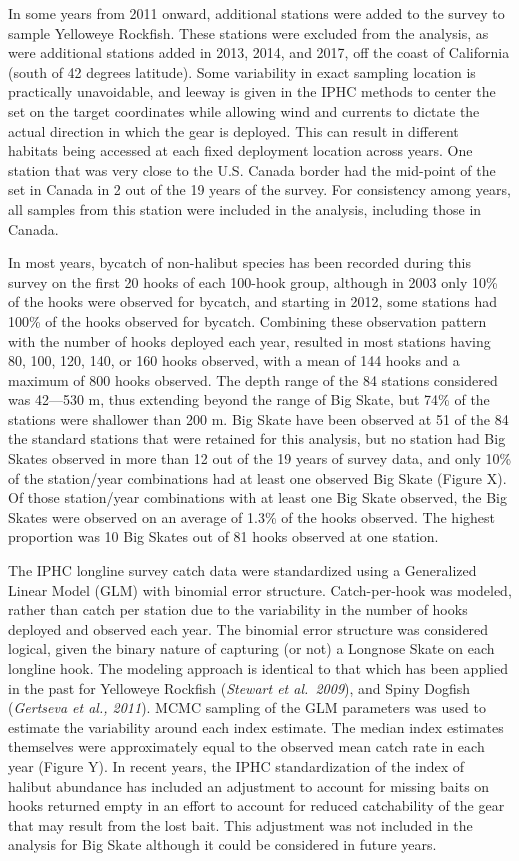 \documentclass[12pt,]{article}
\begin{document}
In some years from 2011 onward, additional stations were added to the
survey to sample Yelloweye Rockfish. These stations were excluded from
the analysis, as were additional stations added in 2013, 2014, and 2017,
off the coast of California (south of 42 degrees latitude). Some
variability in exact sampling location is practically unavoidable, and
leeway is given in the IPHC methods to center the set on the target
coordinates while allowing wind and currents to dictate the actual
direction in which the gear is deployed. This can result in different
habitats being accessed at each fixed deployment location across years.
One station that was very close to the U.S. Canada border had the
mid-point of the set in Canada in 2 out of the 19 years of the survey.
For consistency among years, all samples from this station were included
in the analysis, including those in Canada.

In most years, bycatch of non-halibut species has been recorded during
this survey on the first 20 hooks of each 100-hook group, although in
2003 only 10\% of the hooks were observed for bycatch, and starting in
2012, some stations had 100\% of the hooks observed for bycatch.
Combining these observation pattern with the number of hooks deployed
each year, resulted in most stations having 80, 100, 120, 140, or 160
hooks observed, with a mean of 144 hooks and a maximum of 800 hooks
observed. The depth range of the 84 stations considered was 42---530 m,
thus extending beyond the range of Big Skate, but 74\% of the stations
were shallower than 200 m. Big Skate have been observed at 51 of the 84
the standard stations that were retained for this analysis, but no
station had Big Skates observed in more than 12 out of the 19 years of
survey data, and only 10\% of the station/year combinations had at least
one observed Big Skate (Figure X). Of those station/year combinations
with at least one Big Skate observed, the Big Skates were observed on an
average of 1.3\% of the hooks observed. The highest proportion was 10
Big Skates out of 81 hooks observed at one station.

The IPHC longline survey catch data were standardized using a
Generalized Linear Model (GLM) with binomial error structure.
Catch-per-hook was modeled, rather than catch per station due to the
variability in the number of hooks deployed and observed each year. The
binomial error structure was considered logical, given the binary nature
of capturing (or not) a Longnose Skate on each longline hook. The
modeling approach is identical to that which has been applied in the
past for Yelloweye Rockfish (\emph{Stewart et al.~2009}), and Spiny
Dogfish (\emph{Gertseva et al., 2011}). MCMC sampling of the GLM
parameters was used to estimate the variability around each index
estimate. The median index estimates themselves were approximately equal
to the observed mean catch rate in each year (Figure Y). In recent
years, the IPHC standardization of the index of halibut abundance has
included an adjustment to account for missing baits on hooks returned
empty in an effort to account for reduced catchability of the gear that
may result from the lost bait. This adjustment was not included in the
analysis for Big Skate although it could be considered in future years.
\newpage
\end{document}
